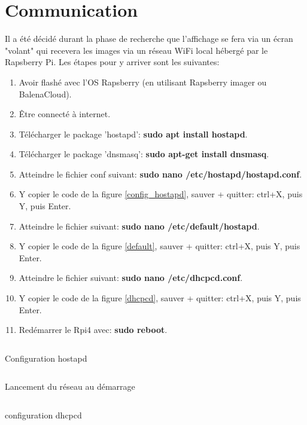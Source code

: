 \section{Communication}
Il a été décidé durant la phase de recherche que l'affichage se fera via un écran "volant" qui recevera les images via un réseau WiFi local
hébergé par le Rapsberry Pi. Les étapes pour y arriver sont les suivantes:
\begin{enumerate}
    \item Avoir flashé avec l'OS Rapsberry (en utilisant Rapsberry imager ou BalenaCloud).
    \item Être connecté à internet.
    \item Télécharger le package 'hostapd': \textbf{sudo apt install hostapd}.
    \item Télécharger le package 'dnsmasq': \textbf{sudo apt-get install dnsmasq}.
    \item Atteindre le fichier conf suivant: \textbf{sudo nano /etc/hostapd/hostapd.conf}.
    \item Y copier le code de la figure \ref{config_hostapd}, sauver + quitter: ctrl+X, puis Y, puis Enter.
    \item Atteindre le fichier suivant: \textbf{sudo nano /etc/default/hostapd}.
    \item Y copier le code de la figure \ref{default}, sauver + quitter: ctrl+X, puis Y, puis Enter.
    \item Atteindre le fichier suivant: \textbf{sudo nano /etc/dhcpcd.conf}.
    \item Y copier le code de la figure \ref{dhcpcd}, sauver + quitter: ctrl+X, puis Y, puis Enter.
    \item Redémarrer le Rpi4 avec: \textbf{sudo reboot}.
\end{enumerate}

\begin{listing}[h]
    \inputminted{makefile}{assets/figures/hostapd.make}
    \caption{Configuration hostapd \label{config_hostapd}}
\end{listing}

\begin{listing}[h]
    \inputminted{makefile}{assets/figures/default.make}
    \caption{Lancement du réseau au démarrage \label{default}}
\end{listing}

\begin{listing}[h]
    \inputminted{makefile}{assets/figures/dhcpcd.java}
    \caption{configuration dhcpcd \label{dhcpcd}}
\end{listing}

